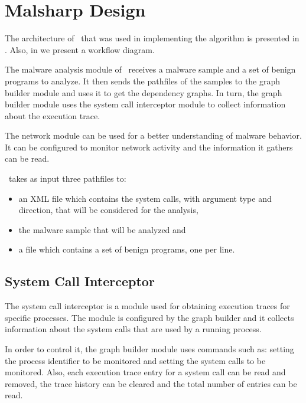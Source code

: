 \section{Malsharp Design}
\label{third:design}

The architecture of \project\ that was used in implementing the algorithm is presented in . Also, in  we present a workflow diagram.

The malware analysis module of \project\ receives a malware sample and a set of benign programs to analyze. It then sends the pathfiles of the samples to the graph builder module and uses it to get the dependency graphs. In turn, the graph builder module uses the system call interceptor module to collect information about the execution trace.

The network module can be used for a better understanding of malware behavior. It can be configured to monitor network activity and the information it gathers can be read.


\project\ takes as input three pathfiles to: 
\begin{itemize}
	\item an XML file which contains the system calls, with argument type and direction, that will be considered for the analysis,
	\item the malware sample that will be analyzed and
	\item a file which contains a set of benign programs, one per line.
\end{itemize}

\subsection{System Call Interceptor}

The system call interceptor is a module used for obtaining execution traces for specific processes. The module is configured by the graph builder and it collects information about the system calls that are used by a running process.

In order to control it, the graph builder module uses commands such as: setting the process identifier to be monitored and setting the system calls to be monitored. Also, each execution trace entry for a system call can be read and removed, the trace history can be cleared and the total number of entries can be read.

